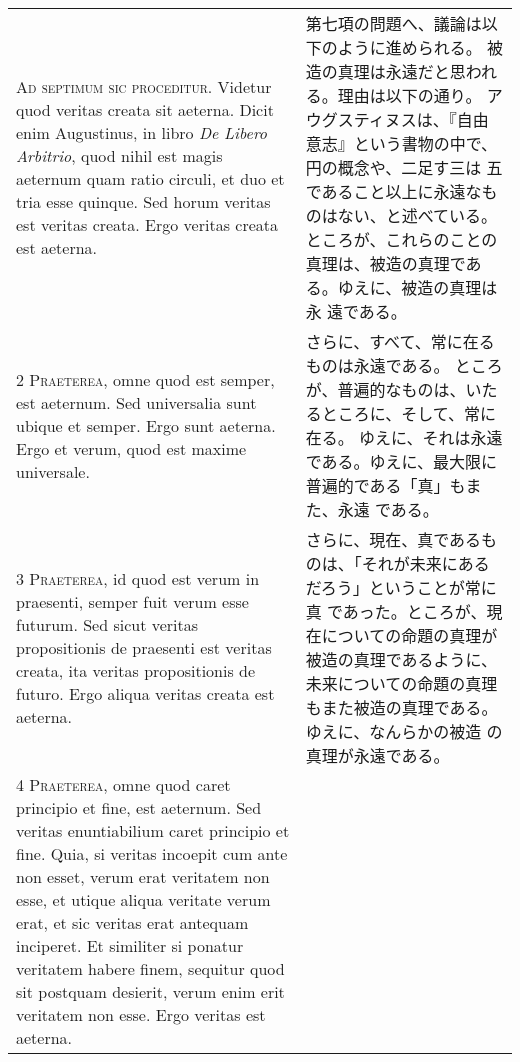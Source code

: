 \documentclass[10pt]{jsarticle} %
\begin{document}
\begin{longtable}{p{21em}p{21em}}

{\huge A}{\scshape d septimum sic
 proceditur}. Videtur quod veritas creata sit aeterna. Dicit enim
 Augustinus, in libro {\itshape De Libero Arbitrio}, quod nihil est magis aeternum
 quam ratio circuli, et duo et tria esse quinque. Sed horum veritas est
 veritas creata. Ergo veritas creata est aeterna.


&

第七項の問題へ、議論は以下のように進められる。
被造の真理は永遠だと思われる。理由は以下の通り。
アウグスティヌスは、『自由意志』という書物の中で、円の概念や、二足す三は
 五であること以上に永遠なものはない、と述べている。
ところが、これらのことの真理は、被造の真理である。ゆえに、被造の真理は永
 遠である。

\\



{\scshape 2 Praeterea}, omne quod est semper,
 est aeternum. Sed universalia sunt ubique et semper. Ergo sunt
 aeterna. Ergo et verum, quod est maxime universale.


&
さらに、すべて、常に在るものは永遠である。
ところが、普遍的なものは、いたるところに、そして、常に在る。
ゆえに、それは永遠である。ゆえに、最大限に普遍的である「真」もまた、永遠
 である。


\\



{\scshape 3 Praeterea}, id quod est verum in
 praesenti, semper fuit verum esse futurum. Sed sicut veritas
 propositionis de praesenti est veritas creata, ita veritas
 propositionis de futuro. Ergo aliqua veritas creata est aeterna.


&

さらに、現在、真であるものは、「それが未来にあるだろう」ということが常に真
 であった。ところが、現在についての命題の真理が被造の真理であるように、
 未来についての命題の真理もまた被造の真理である。ゆえに、なんらかの被造
 の真理が永遠である。

\\



{\scshape 4 Praeterea}, omne quod caret
 principio et fine, est aeternum. Sed veritas enuntiabilium caret
 principio et fine. Quia, si veritas incoepit cum ante non esset, verum
 erat veritatem non esse, et utique aliqua veritate verum erat, et sic
 veritas erat antequam inciperet. Et similiter si ponatur veritatem
 habere finem, sequitur quod sit postquam desierit, verum enim erit
 veritatem non esse. Ergo veritas est aeterna.



\end{longtable}
\end{document}

